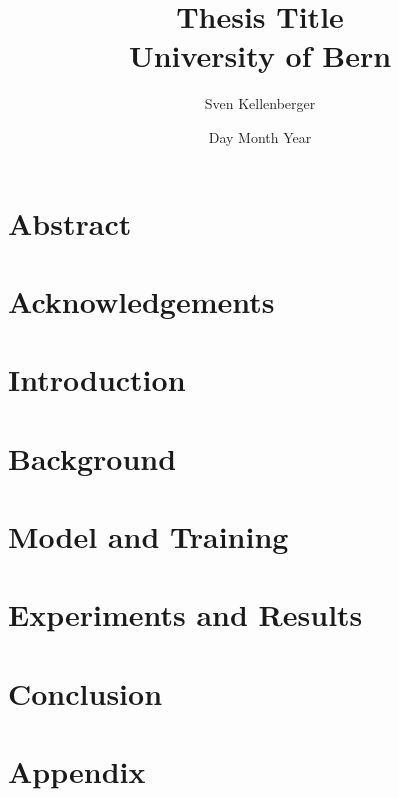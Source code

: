 \documentclass[12pt, twoside]{report}
\begin{document}
\title{
	{Thesis Title}\\
	{\large University of Bern}
}
\author{Sven Kellenberger}
\date{Day Month Year}

\maketitle

\chapter*{Abstract}


\chapter*{Acknowledgements}


\tableofcontents

\chapter{Introduction}


\chapter{Background}


\chapter{Model and Training}


\chapter{Experiments and Results}


\chapter{Conclusion}


\printbibliography

\appendix
\chapter{Appendix}

\end{document}
